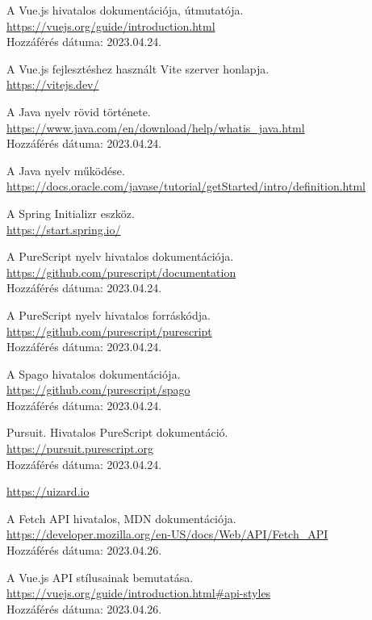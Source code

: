 \documentclass[12pt]{article}
\begin{document}
\begin{thebibliography}{99}
A Vue.js hivatalos dokumentációja, útmutatója. \\ \url{https://vuejs.org/guide/introduction.html} \\Hozzáférés dátuma: 2023.04.24.

A Vue.js fejlesztéshez használt Vite szerver honlapja. \\ \url{https://vitejs.dev/}

A Java nyelv rövid története. \\ \url{https://www.java.com/en/download/help/whatis_java.html} \\Hozzáférés dátuma: 2023.04.24.

A Java nyelv működése. \\ \url{https://docs.oracle.com/javase/tutorial/getStarted/intro/definition.html}

A Spring Initializr eszköz. \\ \url{https://start.spring.io/}

A PureScript nyelv hivatalos dokumentációja.\\
\url{https://github.com/purescript/documentation} \\Hozzáférés dátuma: 2023.04.24.

A PureScript nyelv hivatalos forráskódja.\\
\url{https://github.com/purescript/purescript}\\ Hozzáférés dátuma: 2023.04.24.

A Spago hivatalos dokumentációja.\\
\url{https://github.com/purescript/spago}\\ Hozzáférés dátuma: 2023.04.24.

Pursuit. Hivatalos PureScript dokumentáció.\\
\url{https://pursuit.purescript.org} \\Hozzáférés dátuma: 2023.04.24.

\url{https://uizard.io} 

A Fetch API hivatalos, MDN dokumentációja. \\ \url{https://developer.mozilla.org/en-US/docs/Web/API/Fetch_API}\\ Hozzáférés dátuma: 2023.04.26.

A Vue.js API stílusainak bemutatása. \\ \url{https://vuejs.org/guide/introduction.html#api-styles} \\Hozzáférés dátuma: 2023.04.26.


\end{thebibliography}
\end{document}
